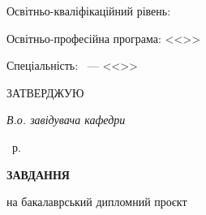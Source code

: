 \thispagestyle{empty}%
\begin{center}%
\thesisOrganization

\thesisOOrganization

\thesisInstitute

\thesisDepartment
\end{center}
%
\vspace{0pt plus0fill} %
\begin{flushleft}%
Освітньо-кваліфікаційний рівень: \thesisDegree

Освітньо-професійна програма: <<\thesisOsvitnyaPrograma>>

Спеціальність: \thesisSpecialtyNumber~---
<<\thesisSpecialtyTitle>>

\end{flushleft}%

\vspace{0pt plus0fill}
\begin{flushright}%
\MakeUppercase{Затверджую}

\textsl {В.о. завідувача кафедри}
\begin{flushright}
\underline{\hspace{0.15\textwidth}} \; \textbf{\thisisHD}
\end{flushright}%
\begin{flushright}
\underline{\hspace{0.1\textwidth}} \underline{\hspace{0.2\textwidth}} \the\year\ р.
\end{flushright}%
\end{flushright}%
%
\vspace{1cm} 
\begin{center}%
\textbf{ЗАВДАННЯ}

на бакалаврський дипломний проєкт
\end{center}%
%
\begin{center}%
\textit{\thesisAuthorTask}
\end{center}%

